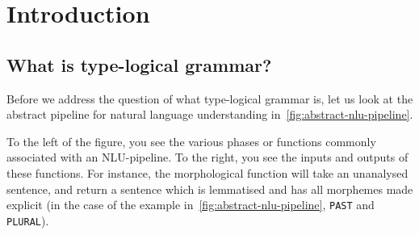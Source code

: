 \section{Introduction}
\label{sec:introduction}

\subsection{What is type-logical grammar?}
\label{sec:what-is-type-logical-grammar}

Before we address the question of what type-logical grammar is, let us
look at the abstract pipeline for natural language understanding
in~\autoref{fig:abstract-nlu-pipeline}.



To the left of the figure, you see the various phases or functions
commonly associated with an NLU-pipeline. To the right, you see the
inputs and outputs of these functions.
For instance, the morphological function will take an unanalysed
sentence, and return a sentence which is lemmatised and has all
morphemes made explicit (in the case of the example
in~\autoref{fig:abstract-nlu-pipeline}, \texttt{PAST} and
\texttt{PLURAL}).

